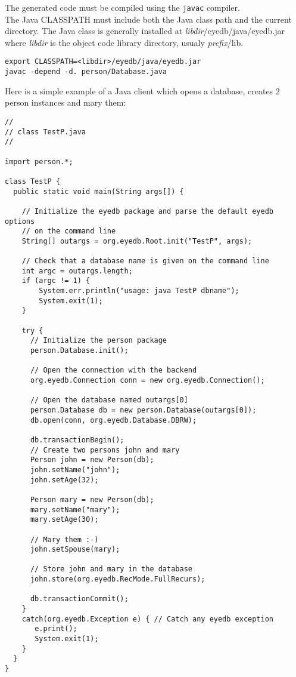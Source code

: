 The generated code must be compiled using the \texttt{javac} compiler.
\\
The Java CLASSPATH must include both the \eyedb Java class path and
the current directory.
The \eyedb Java class is generally installed at
\emph{libdir}/eyedb/java/eyedb.jar where \emph{libdir} is
the object code library directory, usualy \emph{prefix}/lib.
{\verbsize \begin{verbatim}
export CLASSPATH=<libdir>/eyedb/java/eyedb.jar
javac -depend -d. person/Database.java 
\end{verbatim}
}

Here is a simple example of a Java client which opens a database,
creates 2 person instances and mary them:
{\verbsize \begin{verbatim}
//
// class TestP.java
//

import person.*;

class TestP {
  public static void main(String args[]) {

    // Initialize the eyedb package and parse the default eyedb options
    // on the command line
    String[] outargs = org.eyedb.Root.init("TestP", args);
     
    // Check that a database name is given on the command line
    int argc = outargs.length;
    if (argc != 1) {
        System.err.println("usage: java TestP dbname");
        System.exit(1);
    }

    try {
      // Initialize the person package
      person.Database.init();

      // Open the connection with the backend
      org.eyedb.Connection conn = new org.eyedb.Connection();

      // Open the database named outargs[0]
      person.Database db = new person.Database(outargs[0]);
      db.open(conn, org.eyedb.Database.DBRW);

      db.transactionBegin();
      // Create two persons john and mary
      Person john = new Person(db);
      john.setName("john");
      john.setAge(32);
     
      Person mary = new Person(db);
      mary.setName("mary");
      mary.setAge(30);
     
      // Mary them :-)
      john.setSpouse(mary);

      // Store john and mary in the database
      john.store(org.eyedb.RecMode.FullRecurs);

      db.transactionCommit();
    }
    catch(org.eyedb.Exception e) { // Catch any eyedb exception
       e.print();
       System.exit(1);
    }
  }
}
\end{verbatim}
}
